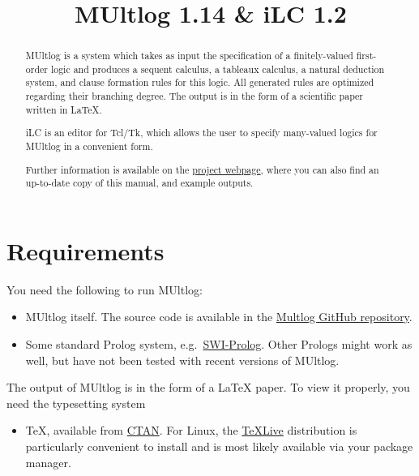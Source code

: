 \documentclass[]{article}
\title{MUltlog 1.14 \& iLC 1.2}
\date{}
\providecommand{\tightlist}{%
  \setlength{\itemsep}{0pt}\setlength{\parskip}{0pt}}
\begin{document}
\maketitle

\begin{abstract}

MUltlog is a system which takes as input the specification of a finitely-valued first-order logic and produces a sequent
calculus,  a tableaux calculus, a natural deduction system, and clause formation rules for this logic. All generated
rules are optimized regarding their branching degree. The output is in the form of a scientific paper written in LaTeX.

iLC is an editor for Tcl/Tk, which allows the user to specify many-valued logics for MUltlog in a convenient form.

Further information is available on the
\href{http://www.logic.at/multlog/}{project webpage}, where you can also
find an up-to-date copy of this manual, and example outputs.
\end{abstract}

\newpage

{
\setcounter{tocdepth}{3}
\tableofcontents
}
\newpage

\hypertarget{requirements}{%
\section{Requirements}\label{requirements}}

You need the following to run MUltlog:

\begin{itemize}
\item
  MUltlog itself. The source code is available in the
  \href{https://github.com/rzach/multlog}{Multlog GitHub repository}.
\item
  Some standard Prolog system,
  e.g.~\href{https://www.swi-prolog.org/}{SWI-Prolog}. Other Prologs
  might work as well, but have not been tested with recent versions of MUltlog.
\end{itemize}

The output of MUltlog is in the form of a LaTeX paper. To view it
properly, you need the typesetting system

\begin{itemize}
\tightlist
\item
  TeX, available from \href{https://ctan.org/}{CTAN}. For Linux, the
  \href{https://www.tug.org/texlive/}{TeXLive} distribution is
  particularly convenient to install and is most likely available via
  your package manager.
\end{itemize}
\end{document}
